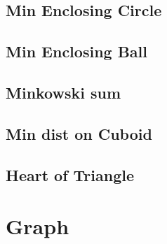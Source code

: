 \documentclass[a4paper,10pt,twocolumn,oneside]{article}
\begin{document}
\subsection{Min Enclosing Circle}


\subsection{Min Enclosing Ball}


%

\subsection{Minkowski sum}


% 

%

\subsection{Min dist on Cuboid}


\subsection{Heart of Triangle}


\section{Graph}
%
\end{document}
